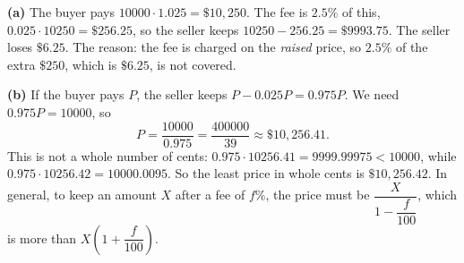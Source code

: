 \textbf{(a)} The buyer pays $10000\cdot1.025=\$10{,}250$. The fee is $2.5\%$ of this, $0.025\cdot10250=\$256.25$, so the seller keeps $10250-256.25=\$9993.75$. The seller loses $\boxed{\$6.25}$. The reason: the fee is charged on the \emph{raised} price, so $2.5\%$ of the extra $\$250$, which is $\$6.25$, is not covered.

\textbf{(b)} If the buyer pays $P$, the seller keeps $P-0.025P=0.975P$. We need $0.975P=10000$, so
\[P=\dfrac{10000}{0.975}=\dfrac{400000}{39}\approx\$10{,}256.41.\]
This is not a whole number of cents: $0.975\cdot10256.41=9999.99975<10000$, while $0.975\cdot10256.42=10000.0095$. So the least price in whole cents is $\boxed{\$10{,}256.42}$. In general, to keep an amount $X$ after a fee of $f\%$, the price must be $\dfrac{X}{1-\dfrac{f}{100}}$, which is more than $X\left(1+\dfrac{f}{100}\right)$.
